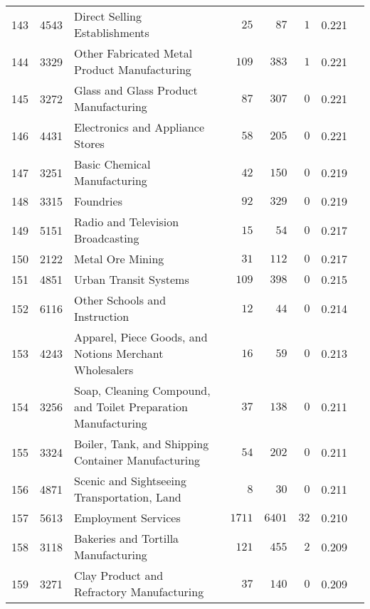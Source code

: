 \documentclass[9pt, oneside]{article}   	%
\begin{document}
\begin{longtable}{lcp{3 in}ccccc}
143  & 4543 & Direct Selling Establishments & $\phantom{00}25$ & $\phantom{00}87$ & $\phantom{0}1$ & 0.221 \\
144  & 3329 & Other Fabricated Metal Product Manufacturing & $\phantom{0}109$ & $\phantom{0}383$ & $\phantom{0}1$ & 0.221 \\
145  & 3272 & Glass and Glass Product Manufacturing & $\phantom{00}87$ & $\phantom{0}307$ & $\phantom{0}0$ & 0.221 \\
146  & 4431 & Electronics and Appliance Stores & $\phantom{00}58$ & $\phantom{0}205$ & $\phantom{0}0$ & 0.221 \\
147  & 3251 & Basic Chemical Manufacturing & $\phantom{00}42$ & $\phantom{0}150$ & $\phantom{0}0$ & 0.219 \\
148  & 3315 & Foundries & $\phantom{00}92$ & $\phantom{0}329$ & $\phantom{0}0$ & 0.219 \\
149  & 5151 & Radio and Television Broadcasting & $\phantom{00}15$ & $\phantom{00}54$ & $\phantom{0}0$ & 0.217 \\
150  & 2122 & Metal Ore Mining & $\phantom{00}31$ & $\phantom{0}112$ & $\phantom{0}0$ & 0.217 \\
151  & 4851 & Urban Transit Systems & $\phantom{0}109$ & $\phantom{0}398$ & $\phantom{0}0$ & 0.215 \\
152  & 6116 & Other Schools and Instruction & $\phantom{00}12$ & $\phantom{00}44$ & $\phantom{0}0$ & 0.214 \\
153  & 4243 & Apparel, Piece Goods, and Notions Merchant Wholesalers & $\phantom{00}16$ & $\phantom{00}59$ & $\phantom{0}0$ & 0.213 \\
154  & 3256 & Soap, Cleaning Compound, and Toilet Preparation Manufacturing & $\phantom{00}37$ & $\phantom{0}138$ & $\phantom{0}0$ & 0.211 \\
155  & 3324 & Boiler, Tank, and Shipping Container Manufacturing & $\phantom{00}54$ & $\phantom{0}202$ & $\phantom{0}0$ & 0.211 \\
156  & 4871 & Scenic and Sightseeing Transportation, Land & $\phantom{000}8$ & $\phantom{00}30$ & $\phantom{0}0$ & 0.211 \\
157  & 5613 & Employment Services & $1711$ & $6401$ & $32$ & 0.210 \\
158  & 3118 & Bakeries and Tortilla Manufacturing & $\phantom{0}121$ & $\phantom{0}455$ & $\phantom{0}2$ & 0.209 \\
159  & 3271 & Clay Product and Refractory Manufacturing & $\phantom{00}37$ & $\phantom{0}140$ & $\phantom{0}0$ & 0.209 \\

\end{longtable}
\end{document}
